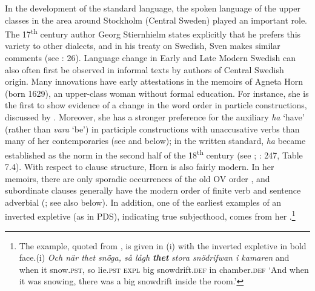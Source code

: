 \documentclass[output=paper]{langscibook}
\begin{document}
In the development of the standard language, the spoken language of the upper classes in the area around Stockholm (Central Sweden) played an important role. The 17\textsuperscript{th} century author Georg Stiernhielm states explicitly that he prefers this variety to other dialects, and in his treaty on Swedish, Sven \citet{Hof1753} makes similar comments (see \citealt{Widmark2000}: 26). Language change in Early and Late Modern Swedish can also often first be observed in informal texts by authors of Central Swedish origin. Many innovations have early attestations in the memoirs of Agneta Horn (born 1629), an upper-class woman without formal education. For instance, she is the first to show evidence of a change in the word order in particle constructions, discussed by . Moreover, she has a stronger preference for the auxiliary \textit{ha} ‘have’ (rather than \textit{vara} ‘be’) in participle constructions with unaccusative verbs than many of her contemporaries (see \citealt{Larsson2009} and below); in the written standard, \textit{ha} became established as the norm in the second half of the 18\textsuperscript{th} century (see \citealt{Johannisson1945}; \citealt{Larsson2009}: 247, Table 7.4). With respect to clause structure, Horn is also fairly modern. In her memoirs, there are only sporadic occurrences of the old OV order \citep{Petzell2011}, and subordinate clauses generally have the modern order of finite verb and sentence adverbial (\citealt{Falk1993}; see also  below). In addition, one of the earliest examples of an inverted expletive (as in PDS), indicating true subjecthood, comes from her \citep[268]{Falk1993}.\footnote{The example, quoted from \citet[268]{Falk1993}, is given in (i) with the inverted expletive in bold face.(i)  \textit{Och  när    thet  snöga,    så  lågh} \textbf{\textit{thet}} \textit{stora  snödrifwan    i    kamaren}  and  when  it      snow.\textsc{pst},  so  lie.\textsc{pst}  \textsc{expl}  big    snowdrift.\textsc{def}    in  chamber.\textsc{def}  ‘And when it was snowing, there was a big snowdrift inside the room.’}
\end{document}
